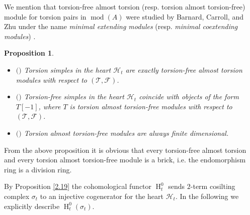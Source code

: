 \documentclass[12pt]{amsart}
\numberwithin{equation}{section}
\newtheorem{proposition}[lemma]{Proposition}
\theoremstyle{definition}
\DeclareMathOperator{\modd}{mod}
\DeclareMathOperator{\HH}{H}
\newtheorem*{theorem 0*}{Theorem}
\newtheorem*{theorem a*}{Theorem A}
\newtheorem*{theorem b*}{Theorem B}
\numberwithin{diagram}{section}
\begin{document}
We mention that torsion-free almost torsion (resp. torsion almost torsion-free) module for torsion pairs in $\modd(A)$ were studied by Barnard, Carroll, and Zhu under the name {\it minimal extending modules} (resp. {\it minimal coextending modules}) \cite{BKZ}.
	
\begin{proposition}\label{2.21}
	\begin{itemize}
	\item[(1)]$($\cite{AHL}$)$
     Torsion simples in the heart $\mathcal{H}_t$ are exactly torsion-free almost torsion modules with respect to $(\mathcal{T},\mathcal{F})$.
	\item[(2)]$($\cite{AHL}$)$
    Torsion-free simples in the heart $\mathcal{H}_t$ coincide with objects of the form $T[-1]$, where $T$ is torsion almost torsion-free modules with respect to $(\mathcal{T},\mathcal{F})$.
     \item[(3)]$($\cite{S}$)$
     Torsion almost torsion-free modules are always finite dimensional.
	\end{itemize}
	\end{proposition}
	
	From the above proposition it is obvious that every torsion-free almost torsion and every torsion almost torsion-free module is a brick, i.e. the endomorphism ring is a division ring. 
	
	By Proposition \ref{2.19} the cohomological functor $\HH^0_t$ sends $2$-term cosilting complex $\sigma_t$ to an injective cogenerator for the heart $\mathcal{H}_t$. In the following we explicitly describe $\HH^0_t(\sigma_t)$.
	
\end{document}
